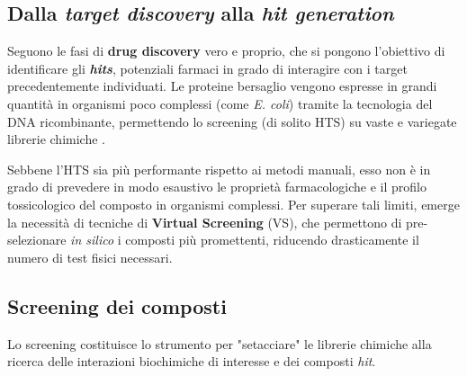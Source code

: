 \subsection{Dalla \texorpdfstring{\textit{target discovery}}{target discovery} alla \texorpdfstring{\textit{hit generation}}{hit generation}}
Seguono le fasi di \textbf{drug discovery} vero e proprio, che si pongono l'obiettivo di identificare gli \textbf{\textit{hits}}, potenziali farmaci in grado di interagire con i target precedentemente individuati.
Le proteine bersaglio vengono espresse in grandi quantità in organismi poco complessi (come \textit{E. coli}) tramite la tecnologia del DNA ricombinante, permettendo lo screening (di solito HTS) su vaste e variegate librerie chimiche \cite{keshTargetBasedScreeningLead2023}.

Sebbene l'HTS sia più performante rispetto ai metodi manuali, esso non è in grado di prevedere in modo esaustivo le proprietà farmacologiche e il profilo tossicologico del composto in organismi complessi.
Per superare tali limiti, emerge la necessità di tecniche di \textbf{Virtual Screening} (VS), che permettono di pre-selezionare \textit{in silico} i composti più promettenti, riducendo drasticamente il numero di test fisici necessari.
\subsection{Screening dei composti}
Lo screening costituisce lo strumento per "setacciare" le librerie chimiche alla ricerca delle interazioni biochimiche di interesse e dei composti \textit{hit}.


